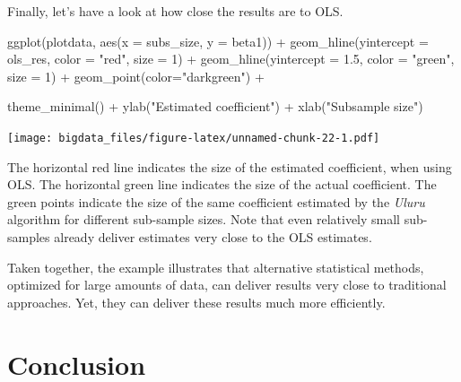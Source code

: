 \documentclass[
  12pt,
]{style/krantz}
\newenvironment{Shaded}{\begin{snugshade}}{\end{snugshade}}
\newcommand{\AttributeTok}[1]{\textcolor[rgb]{0.77,0.63,0.00}{#1}}
\newcommand{\DecValTok}[1]{\textcolor[rgb]{0.00,0.00,0.81}{#1}}
\newcommand{\FloatTok}[1]{\textcolor[rgb]{0.00,0.00,0.81}{#1}}
\newcommand{\FunctionTok}[1]{\textcolor[rgb]{0.00,0.00,0.00}{#1}}
\newcommand{\NormalTok}[1]{#1}
\newcommand{\SpecialCharTok}[1]{\textcolor[rgb]{0.00,0.00,0.00}{#1}}
\newcommand{\StringTok}[1]{\textcolor[rgb]{0.31,0.60,0.02}{#1}}
\begin{document}
Finally, let's have a look at how close the results are to OLS.

\begin{Shaded}
\begin{Highlighting}[]
\FunctionTok{ggplot}\NormalTok{(plotdata, }\FunctionTok{aes}\NormalTok{(}\AttributeTok{x =}\NormalTok{ subs\_size, }\AttributeTok{y =}\NormalTok{ beta1)) }\SpecialCharTok{+}
     \FunctionTok{geom\_hline}\NormalTok{(}\AttributeTok{yintercept =}\NormalTok{ ols\_res,}
                \AttributeTok{color =} \StringTok{"red"}\NormalTok{, }
                \AttributeTok{size =} \DecValTok{1}\NormalTok{) }\SpecialCharTok{+}
       \FunctionTok{geom\_hline}\NormalTok{(}\AttributeTok{yintercept =} \FloatTok{1.5}\NormalTok{,}
                \AttributeTok{color =} \StringTok{"green"}\NormalTok{,}
                \AttributeTok{size =} \DecValTok{1}\NormalTok{) }\SpecialCharTok{+}
     \FunctionTok{geom\_point}\NormalTok{(}\AttributeTok{color=}\StringTok{"darkgreen"}\NormalTok{) }\SpecialCharTok{+} 

     \FunctionTok{theme\_minimal}\NormalTok{() }\SpecialCharTok{+}
     \FunctionTok{ylab}\NormalTok{(}\StringTok{"Estimated coefficient"}\NormalTok{) }\SpecialCharTok{+}
     \FunctionTok{xlab}\NormalTok{(}\StringTok{"Subsample size"}\NormalTok{)}
\end{Highlighting}
\end{Shaded}

\texttt{[image: bigdata\_files/figure-latex/unnamed-chunk-22-1.pdf]}

The horizontal red line indicates the size of the estimated coefficient, when using OLS. The horizontal green line indicates the size of the actual coefficient. The green points indicate the size of the same coefficient estimated by the \emph{Uluru} algorithm for different sub-sample sizes. Note that even relatively small sub-samples already deliver estimates very close to the OLS estimates.

Taken together, the example illustrates that alternative statistical methods, optimized for large amounts of data, can deliver results very close to traditional approaches. Yet, they can deliver these results much more efficiently.

\hypertarget{conclusion}{%
\section{Conclusion}\label{conclusion}}
\end{document}
